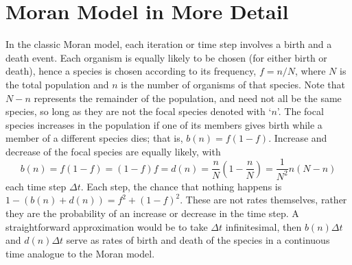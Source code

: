 \section{Moran Model in More Detail}
In the classic Moran model, each iteration or time step involves a birth and a death event.
Each organism is equally likely to be chosen (for either birth or death), hence a species is chosen according to its frequency, $f=n/N$, where $N$ is the total population and $n$ is the number of organisms of that species.
Note that $N-n$ represents the remainder of the population, and need not all be the same species, so long as they are not the focal species denoted with `$n$'.
The focal species increases in the population if one of its members gives birth while a member of a different species dies; that is, $b(n) = f(1-f)$.
Increase and decrease of the focal species are equally likely, with
\begin{equation}
b(n) = f(1-f) = (1-f)f = d(n) = \frac{n}{N}\left(1-\frac{n}{N}\right) = \frac{1}{N^2}n(N-n)
\end{equation}
each time step $\Delta t$.
Each step, the chance that nothing happens is $1-\left(b(n)+d(n)\right) = f^2 + (1-f)^2$.
These are not rates themselves, rather they are the probability of an increase or decrease in the time step.
A straightforward approximation would be to take $\Delta t$ infinitesimal, then $b(n)\Delta t$ and $d(n)\Delta t$ serve as rates of birth and death of the species in a continuous time analogue to the Moran model.

